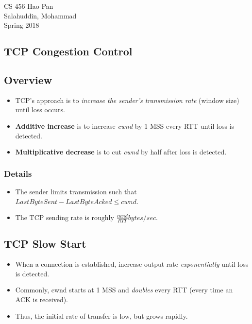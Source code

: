 \documentclass{article}
\begin{document}
\noindent
{CS 456 \hfill Hao Pan}\\
{Salahuddin, Mohammad}\\
{Spring 2018}


\begin{center}
\section{TCP Congestion Control}
\noindent
\end{center}

\subsection{Overview}

\begin{itemize}
\item TCP's approach is to \emph{increase the sender's transmission rate} (window size) until loss occurs.
\item {\bf Additive increase} is to increase \emph{cwnd} by 1 MSS every RTT until loss is detected.
\item {\bf Multiplicative decrease} is to cut \emph{cwnd} by half after loss is detected.
\end{itemize}

\subsubsection{Details}
\begin{itemize}
\item The sender limits transmission such that $LastByteSent - LastByteAcked \le cwnd$.
\item The TCP sending rate is roughly $\frac{cwnd}{RTT}bytes/sec$.
\end{itemize}

\subsection{TCP Slow Start}

\begin{itemize}
\item When a connection is established, increase output rate \emph{exponentially} until loss is detected.
\item Commonly, cwnd starts at 1 MSS and \emph{doubles} every RTT (every time an ACK is received).
\item Thus, the initial rate of transfer is low, but grows rapidly.
\end{itemize}
\end{document}
